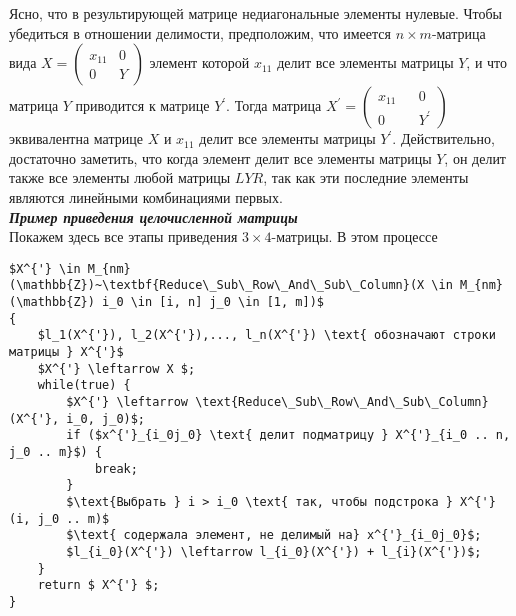 Ясно, что в результирующей матрице недиагональные элементы нулевые. Чтобы убедиться в отношении делимости, предположим, что имеется $n \times m$-матрица вида $ X = \begin{pmatrix} 
x_{11} & 0 \\ 0 & Y \end{pmatrix}$ элемент которой $x_{11}$ делит все элементы матрицы $Y$, и что матрица $Y$ приводится к матрице $Y^{'}$. Тогда матрица  $ X^{'} = \begin{pmatrix} x_{11} && 0\\ 0 && Y^{'} \end{pmatrix}$ эквивалентна матрице $X$ и $x_{11}$ делит все элементы матрицы $Y^{'}$. Действительно, достаточно заметить, что когда элемент делит все элементы  матрицы $Y$, он делит также все элементы любой матрицы $L Y R$, так как эти последние элементы являются линейными комбинациями первых.\\

\noindent\textbf{\textit{Пример приведения целочисленной матрицы}}\\

Покажем здесь все этапы приведения $3 \times 4$-матрицы. В этом процессе\\

\begin{lstlisting}[mathescape=true]
$X^{'} \in M_{nm}(\mathbb{Z})~\textbf{Reduce\_Sub\_Row\_And\_Sub\_Column}(X \in M_{nm}(\mathbb{Z}) i_0 \in [i, n] j_0 \in [1, m])$ 
{
	$l_1(X^{'}), l_2(X^{'}),..., l_n(X^{'}) \text{ обозначают строки матрицы } X^{'}$
	$X^{'} \leftarrow X $;	
	while(true) {
		$X^{'} \leftarrow \text{Reduce\_Sub\_Row\_And\_Sub\_Column}(X^{'}, i_0, j_0)$;
		if ($x^{'}_{i_0j_0} \text{ делит подматрицу } X^{'}_{i_0 .. n, j_0 .. m}$) {
			break;
		}
		$\text{Выбрать } i > i_0 \text{ так, чтобы подстрока } X^{'}(i, j_0 .. m)$
		$\text{ содержала элемент, не делимый на} x^{'}_{i_0j_0}$;
		$l_{i_0}(X^{'}) \leftarrow l_{i_0}(X^{'}) + l_{i}(X^{'})$;
	}
	return $ X^{'} $;
}
\end{lstlisting}

